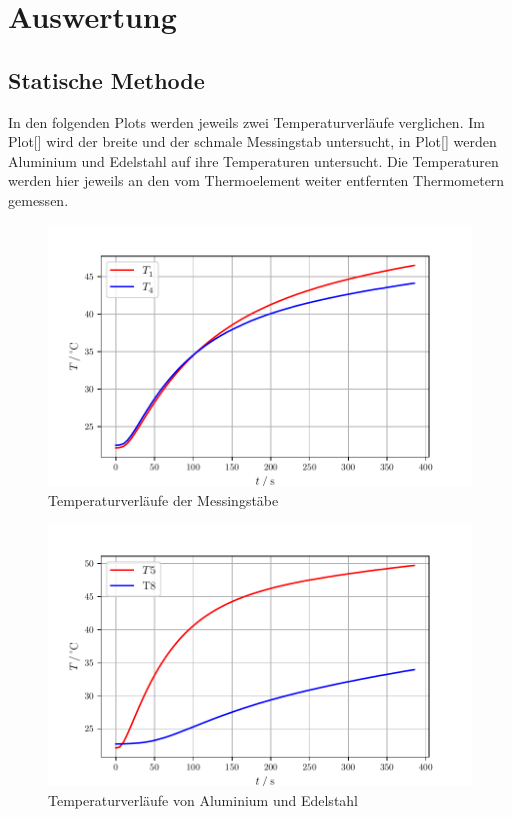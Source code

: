 \section{Auswertung}
\label{sec:Auswertung}


\subsection{Statische Methode}
In den folgenden Plots werden jeweils zwei Temperaturverläufe verglichen. Im Plot[] wird der breite und der schmale 
Messingstab untersucht, in Plot[] werden Aluminium und Edelstahl auf ihre Temperaturen untersucht. Die Temperaturen werden hier jeweils
an den vom Thermoelement weiter entfernten Thermometern gemessen.

\begin{figure}
    \centering
    \includegraphics[width=\textwidth]{data/T1T4.pdf}
    \caption{Temperaturverläufe der Messingstäbe}
    \label{fig:t1t4}
\end{figure}

\begin{figure}
    \centering
    \includegraphics[width=\textwidth]{data/T5T8.pdf}
    \caption{Temperaturverläufe von Aluminium und Edelstahl}
    \label{fig:t5t8}
\end{figure}

